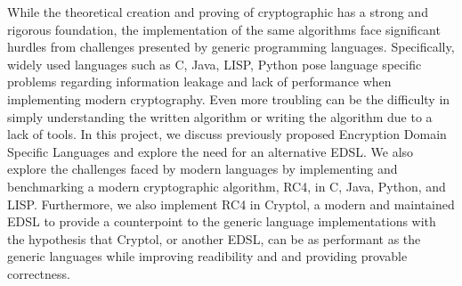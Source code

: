While the theoretical creation and proving of cryptographic has a strong and rigorous foundation, the implementation of the same algorithms face significant hurdles from challenges presented by generic programming languages. Specifically, widely used languages such as C, Java, LISP, Python pose language specific problems regarding information leakage and lack of performance when implementing modern cryptography. Even more troubling can be the difficulty in simply understanding the written algorithm or writing the algorithm due to a lack of tools. In this project, we discuss previously proposed Encryption Domain Specific Languages and explore the need for an alternative EDSL.  We also explore the challenges faced by modern languages by implementing and benchmarking a modern cryptographic algorithm, RC4, in C, Java, Python, and LISP. Furthermore, we also implement RC4 in Cryptol, a modern and maintained EDSL to provide a counterpoint to the generic language implementations with the hypothesis that Cryptol, or another EDSL, can be as performant as the generic languages while improving readibility and and providing provable correctness.